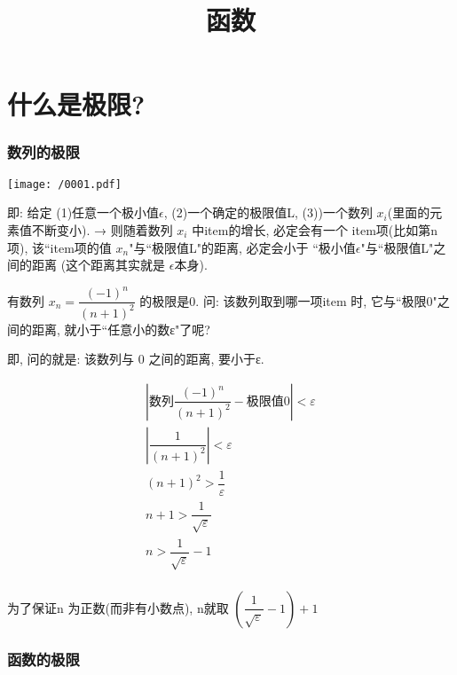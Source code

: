 \documentclass[UTF8]{ctexart}
\title{函数}
\begin{document}
	\tableofcontents %
	\maketitle  %



\part{什么是极限?}

\section{数列的极限}

\texttt{[image: /0001.pdf]}

即: 给定 (1)任意一个极小值$\epsilon $, (2)一个确定的极限值L, (3))一个数列 $ x_i $(里面的元素值不断变小). → 则随着数列 
$ x_i $ 中item的增长, 必定会有一个 item项(比如第n项), 该``item项的值 $ x_n$"与``极限值L"的距离, 必定会小于 ``极小值$\epsilon $"与``极限值L"之间的距离 (这个距离其实就是 $\epsilon $本身). \\



\begin{myEnvSample}
	有数列 $x_n=\dfrac{(-1)^n} {(n+1)^2} $  的极限是0.  问: 该数列取到哪一项item 时, 它与``极限0"之间的距离, 就小于``任意小的数ε"了呢?
	
	即, 问的就是: 该数列与 0 之间的距离, 要小于ε.
	
	
	\[
		\begin{matrix}
			\left| \text{数列}\dfrac{\left( -1 \right) ^n}{\left( n+1 \right) ^2}-\text{极限值}0 \right|<\varepsilon\\
			\left| \dfrac{1}{\left( n+1 \right) ^2} \right|<\varepsilon\\
			\left( n+1 \right) ^2>\dfrac{1}{\varepsilon}\\
			n+1>\dfrac{1}{\sqrt{\varepsilon}}\\
			n>\dfrac{1}{\sqrt{\varepsilon}}-1\\
		\end{matrix}
	\]
	
	为了保证n 为正数(而非有小数点), n就取 $\left( \dfrac{1}{\sqrt{\varepsilon}}-1 \right) +1$	
\end{myEnvSample}




\section{函数的极限}
\end{document}
